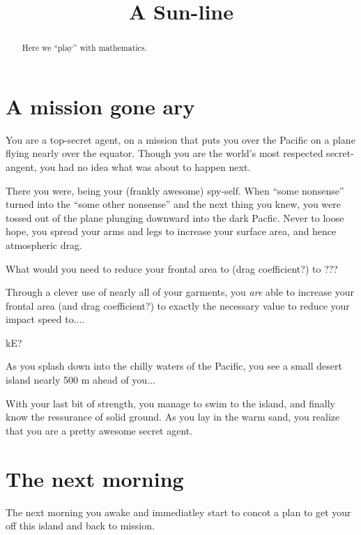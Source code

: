 \documentclass{ximera}
\title[Dig-In:]{A Sun-line}
\begin{document}
\begin{abstract}
  Here we ``play'' with mathematics.
\end{abstract}
\maketitle


\section{A mission gone ary}

You are a top-secret agent, on a mission that puts you over the
Pacific on a plane flying nearly over the equator. Though you are the
world's most respected secret-angent, you had no idea what was about
to happen next.

There you were, being your (frankly awesome) spy-self. When ``some
nonsense'' turned into the ``some other nonsense'' and the next thing
you knew, you were tossed out of the plane plunging downward into the
dark Pacfic. Never to loose hope, you spread your arms and legs to
increase your surface area, and hence atmospheric drag.


What would you need to reduce your frontal area to (drag coefficient?) to ??? 


Through a clever use of nearly all of your garments, you \textit{are}
able to increase your frontal area (and drag coefficient?) to exactly the necessary value to reduce your impact speed to....

kE?

As you splash down into the chilly waters of the Pacific, you see a
small desert island nearly 500 m ahead of you...


With your last bit of strength, you manage to swim to the island, and
finally know the ressurance of solid ground. As you lay in the warm
sand, you realize that you are a pretty awesome secret agent.


\section{The next morning}

The next morning you awake and immediatley start to concot a plan to
get your off this island and back to mission.
\end{document}
